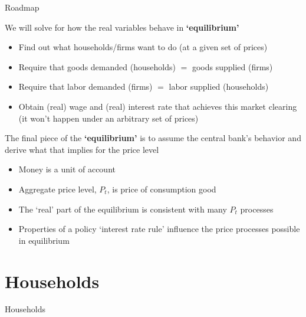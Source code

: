 \begin{frame}{Roadmap}

We will solve for how the real variables behave in \textbf{`equilibrium'}
\begin{itemize}
\item	Find out what households/firms want to do (at a given set of prices)
\item	Require that goods demanded (households) $=$ goods supplied (firms)
\item	Require that labor demanded (firms) $=$ labor supplied (households)
\item	Obtain (real) wage and (real) interest rate that achieves this market clearing (it won't happen under an arbitrary set of prices)
\end{itemize}

\vspace{2mm}
The final piece of the \textbf{`equilibrium'} is to assume the central bank's behavior and derive what that implies for the price level
\begin{itemize}
\item	Money is a unit of account
\item	Aggregate price level, $P_{t}$, is price of consumption good
\item	The `real' part of the equilibrium is consistent with many $P_{t}$ processes
\item	Properties of a policy `interest rate rule' influence the price processes possible in equilibrium
\end{itemize}

\end{frame}

\section{Households}

\begin{frame}

\begin{center}
{\LARGE Households}
\end{center}

\end{frame}


	
